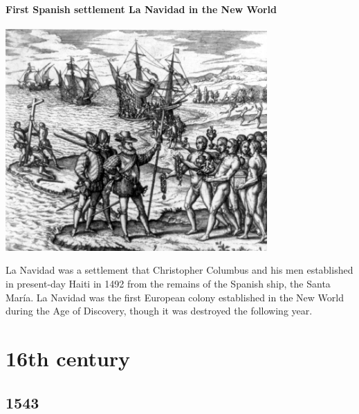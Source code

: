 \documentclass[11pt]{report}
\begin{document}
\subsection{First Spanish settlement La Navidad in the New World}
\vspace{2mm}\begin{center}\includegraphics[width=10cm]{./img/lanavidad.jpg}\end{center}
La Navidad was a settlement that Christopher Columbus and his men established in present-day Haiti in 1492 from the remains of the Spanish ship, the Santa María. La Navidad was the first European colony established in the New World during the Age of Discovery, though it was destroyed the following year.




										
										
\part{16th century}
\chapter{1543}
\section{}
\end{document}
